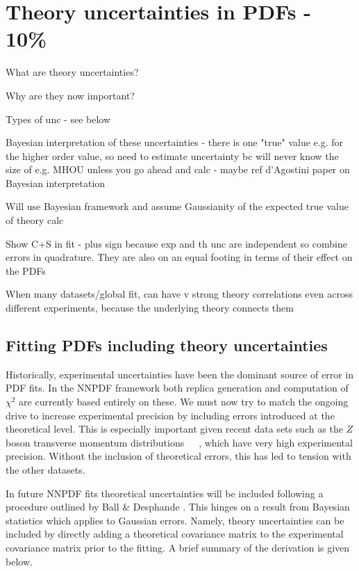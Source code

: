 \chapter{Theory uncertainties in PDFs - 10\%}
\bi 
\item What are theory uncertainties?
\item Why are they now important?
\item Types of unc - see below
\item Bayesian interpretation of these uncertainties - there is one "true" value e.g. for the higher order value, so need to estimate uncertainty bc will never know the size of e.g. MHOU unless you go ahead and calc - maybe ref d'Agostini paper on Bayesian interpretation
\item Will use Bayesian framework and assume Gaussianity of the expected true value of theory calc
\item Show C+S in fit - plus sign because exp and th unc are independent so combine errors in quadrature. They are also on an equal footing in terms of their effect on the PDFs
\item When many datasets/global fit, can have v strong theory correlations even across different experiments, because the underlying theory connects them

\ei
\section{Fitting PDFs including theory uncertainties}
Historically, experimental uncertainties have been the dominant source of error in PDF fits. 
In the NNPDF framework both replica generation and computation of $\chi^2$ 
are currently based entirely on these. We must now try to match the ongoing drive to 
increase experimental precision by including errors introduced at the theoretical level. This is
especially important given recent data sets such as the $Z$ boson transverse momentum
distributions~\cite{Aad:2014xaa}~\cite{Khachatryan:2015oaa}~\cite{Aad:2015auj}, which have very high experimental precision. Without
the inclusion of theoretical errors, this has led to tension with the other datasets.

In future NNPDF fits theoretical uncertainties will be included following a procedure outlined
by Ball \& Desphande \cite{Ball:2018odr}. This hinges on a result from Bayesian statistics
which applies to Gaussian errors. Namely, theory uncertainties can be included by directly 
adding a theoretical
covariance matrix to the experimental covariance matrix prior to the fitting. A brief summary of
the derivation is given below.

